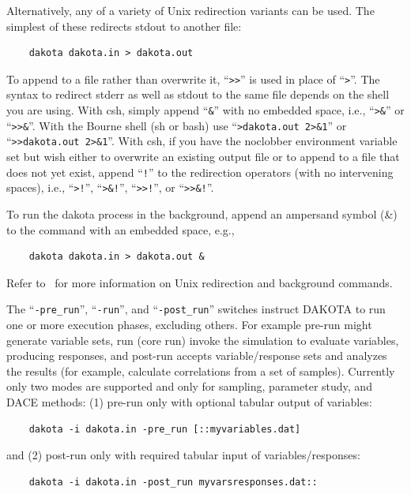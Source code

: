 Alternatively, any of a variety of Unix redirection variants can be
used. The simplest of these redirects stdout to another file:
\begin{small}
\begin{verbatim}
    dakota dakota.in > dakota.out
\end{verbatim}
\end{small}

To append to a file rather than overwrite it, ``\texttt{>>}'' is used
in place of ``\texttt{>}''. The syntax to redirect stderr as well as stdout
to the same file depends on the shell you are using.  With csh, simply append
``\texttt{\&}'' with no embedded space, i.e.,
``\texttt{>\&}'' or ``\texttt{>>\&}''. With the Bourne shell (sh or bash) use
``\texttt{>dakota.out 2>\&1}'' or ``\texttt{>>dakota.out 2>\&1}''.
With csh, if you have the noclobber environment variable set but
wish either to overwrite an existing output file or to append to a file that
does not yet exist, append ``\texttt{!}'' to the redirection operators
(with no intervening spaces), i.e.,
``\texttt{>!}'', ``\texttt{>\&!}'', ``\texttt{>>!}'', or
``\texttt{>>\&!}''.

To run the dakota process in the background, append an ampersand
symbol (\&) to the command with an embedded space, e.g.,
\begin{small}
\begin{verbatim}
    dakota dakota.in > dakota.out &
\end{verbatim}
\end{small}

Refer to~\cite{And86} for more information on Unix redirection and
background commands.

The ``\texttt{-pre\_run}'', ``\texttt{-run}'', and
``\texttt{-post\_run}'' switches instruct DAKOTA to run one or more
execution phases, excluding others.  For example pre-run might
generate variable sets, run (core run) invoke the simulation to
evaluate variables, producing responses, and post-run accepts
variable/response sets and analyzes the results (for example,
calculate correlations from a set of samples).  Currently only two
modes are supported and only for sampling, parameter study, and DACE
methods: (1) pre-run only with optional tabular output of variables:
\begin{small}
\begin{verbatim}
    dakota -i dakota.in -pre_run [::myvariables.dat]
\end{verbatim}
\end{small}
and (2) post-run only with required tabular input of variables/responses:
\begin{small}
\begin{verbatim}
    dakota -i dakota.in -post_run myvarsresponses.dat::
\end{verbatim}
\end{small}

